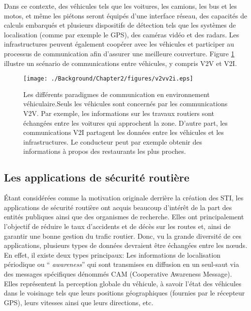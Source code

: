 Dans ce contexte, des véhicules tels que les voitures, les camions, les bus et les motos, et même les piétons seront équipés d'une interface réseau, des capacités de calculs embarqués et plusieurs dispositifs de détection tels que les systèmes de localisation (comme par exemple le GPS), des caméras vidéo et des radars. Les infrastructures peuvent également coopérer avec les véhicules et participer au processus de communication afin d'assurer une meilleure couverture. Figure \ref{ch2:v2vv2i} illustre un scénario de communications entre véhicules, y compris V2V et V2I.

\begin{figure}[h!]
 \centerline{\texttt{[image: ./Background/Chapter2/figures/v2vv2i.eps]}}
\caption[Les différents paradigmes de communication en environnement véhiculaire.] {Les différents paradigmes de communication en environnement véhiculaire.Seuls les véhicules sont concernés par les communications V2V. Par exemple, les informations sur les travaux routiers sont échangées entre les voitures qui approchent la zone. D'autre part, les communications V2I partagent les données entre les véhicules et les infrastructures. Le conducteur peut par exemple obtenir des informations à propos des restaurants les plus proches.} \label{ch2:v2vv2i}
\end{figure}

\subsection{Les applications de sécurité routière}

Étant considérées comme la motivation originale derrière la création des STI, les applications de sécurité routière ont acquis beaucoup d'intérêt de la part des entités publiques ainsi que des organismes de recherche. Elles ont principalement l'objectif de réduire le taux d'accidents et de décès sur les routes et, ainsi de garantir une bonne gestion du trafic routier. Donc, vu la grande diversité de ces applications, plusieurs types de données devraient être échangées entre les nœuds. En effet, il existe deux types principaux: Les informations de localisation périodique ou `` \textit{awareness}'' qui sont transmises en diffusion en un seul-saut via des messages spécifiques dénommés CAM (Cooperative Awareness Message). Elles représentent la perception globale du véhicule, à savoir l'état des véhicules dans le voisinage tels que leurs positions géographiques (fournies par le récepteur GPS), leurs vitesses ainsi que leurs directions, etc.

